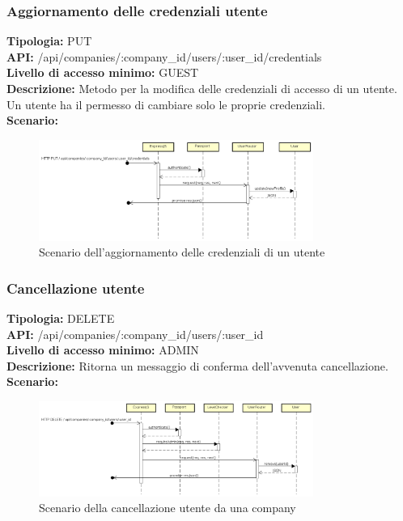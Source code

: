 \newpage
\subsubsection{Aggiornamento delle credenziali utente}
\textbf{Tipologia:} PUT \\
\textbf{API:} /api/companies/:company\_id/users/:user\_id/credentials \\
\textbf{Livello di accesso minimo:} GUEST \\
\textbf{Descrizione:} Metodo per la modifica delle credenziali di accesso di un utente. Un utente ha il permesso di cambiare solo le proprie credenziali. \\
\textbf{Scenario:} 
\begin{figure}[h]
\centering
\includegraphics[width=0.8\textwidth]{res/sections/backend/(PUT)credenzialiUtente.png}
\caption{Scenario dell'aggiornamento delle credenziali di un utente}
\end{figure}

\newpage
\subsubsection{Cancellazione utente}
\textbf{Tipologia:} DELETE \\
\textbf{API:} /api/companies/:company\_id/users/:user\_id \\
\textbf{Livello di accesso minimo:} ADMIN \\
\textbf{Descrizione:} Ritorna un messaggio di conferma dell'avvenuta cancellazione. \\
\textbf{Scenario:} 
\begin{figure}[h]
\centering
\includegraphics[width=0.8\textwidth]{res/sections/backend/(DELETE)user.png}
\caption{Scenario della cancellazione utente da una company}
\end{figure}

